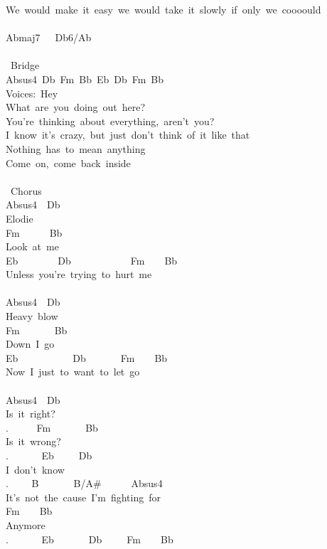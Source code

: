{We\ would\ make\ it\ easy\ we\ would\ take\ it\ slowly\ if\ only\ we\ coooould\\
\\
Abmaj7\ \ \ Db6/Ab\\
\\
\lbrack\ Bridge\rbrack\\
Absus4\ Db\ Fm\ Bb\ Eb\ Db\ Fm\ Bb\ \\
Voices:\ Hey\\
What\ are\ you\ doing\ out\ here?\\
You're\ thinking\ about\ everything,\ aren't\ you?\\
I\ know\ it's\ crazy,\ but\ just\ don't\ think\ of\ it\ like\ that\\
Nothing\ has\ to\ mean\ anything\\
Come\ on,\ come\ back\ inside\\
\\
\lbrack\ Chorus\rbrack\\
Absus4\ \ Db\ \ \ \ \ \ \ \ \ \\
Elodie\\
Fm\ \ \ \ \ \ Bb\\
Look\ at\ me\\
Eb\ \ \ \ \ \ \ \ Db\ \ \ \ \ \ \ \ \ \ \ \ Fm\ \ \ \ Bb\\
Unless\ you're\ trying\ to\ hurt\ me\\
\\
Absus4\ \ Db\ \\
Heavy\ blow\\
Fm\ \ \ \ \ \ \ Bb\\
Down\ I\ go\\
Eb\ \ \ \ \ \ \ \ \ \ \ Db\ \ \ \ \ \ \ Fm\ \ \ \ Bb\\
Now\ I\ just\ to\ want\ to\ let\ go\\
\\
Absus4\ \ Db\\
Is\ it\ right?\\
. \ \ \ \ \ Fm\ \ \ \ \ \ \ Bb\\
Is\ it\ wrong?\\
. \ \ \ \ \ \ Eb\ \ \ \ \ Db\ \\
I\ don't\ know\\
. \ \ \ \ B\ \ \ \ \ \ \ B/A\#\ \ \ \ \ \ Absus4\ \ \\
It's\ not\ the\ cause\ I'm\ fighting\ for\\
Fm\ \ \ \ Bb\\
Anymore\\
. \ \ \ \ \ \ Eb\ \ \ \ \ \ \ Db\ \ \ \ \ Fm\ \ \ \ Bb\\
}
